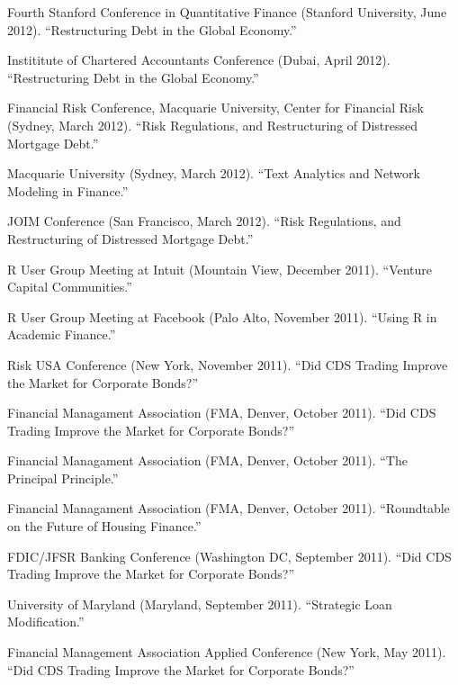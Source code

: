 \documentclass{article}
\begin{document}
\begin{etaremune}
{\item Fourth Stanford Conference in Quantitative Finance (Stanford University, June 2012). ``Restructuring Debt in the Global Economy.''


\item Instititute of Chartered Accountants Conference (Dubai, April 2012). 
``Restructuring Debt in the Global Economy.''

\item Financial Risk Conference, Macquarie University, Center for Financial Risk (Sydney, March 2012).
``Risk Regulations, and Restructuring of Distressed Mortgage Debt.''

\item Macquarie University (Sydney, March 2012).
``Text Analytics and Network Modeling in Finance.''

\item JOIM Conference (San Francisco, March 2012).
``Risk Regulations, and Restructuring of Distressed Mortgage Debt.''

\item R User Group Meeting at Intuit (Mountain View, December 2011). 
``Venture Capital Communities.''

\item R User Group Meeting at Facebook (Palo Alto, November 2011).
``Using R in Academic Finance.''

\item Risk USA Conference (New York, November 2011).
``Did CDS Trading Improve the Market for Corporate Bonds?''

\item Financial Managament Association (FMA, Denver, October 2011).
``Did CDS Trading Improve the Market for Corporate Bonds?''

\item Financial Managament Association (FMA, Denver, October 2011).
``The Principal Principle.''

\item Financial Managament Association (FMA, Denver, October 2011).
``Roundtable on the Future of Housing Finance.''

\item FDIC/JFSR Banking Conference (Washington DC, September 2011). 
``Did CDS Trading Improve the Market for Corporate Bonds?''

\item University of Maryland (Maryland, September 2011). 
``Strategic Loan Modification.''

\item Financial Management Association Applied Conference (New York, May 2011). 
``Did CDS Trading Improve the Market for Corporate Bonds?''

}
\end{etaremune}
\end{document}
